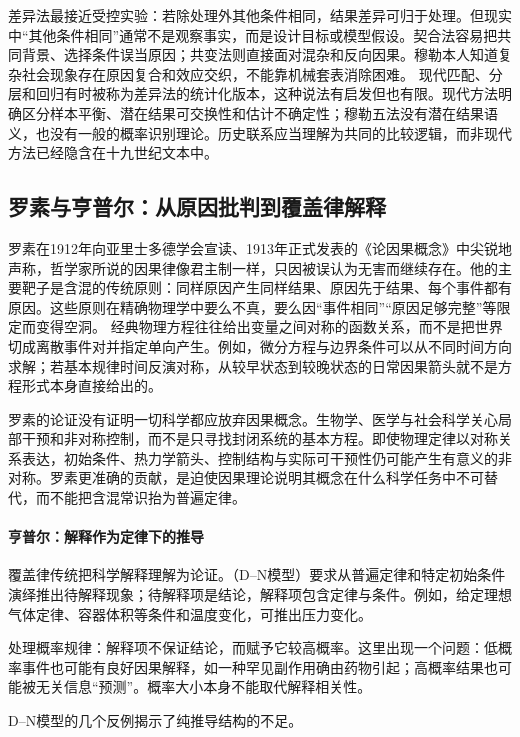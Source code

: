差异法最接近受控实验：若除处理外其他条件相同，结果差异可归于处理。但现实中“其他条件相同”通常不是观察事实，而是设计目标或模型假设。契合法容易把共同背景、选择条件误当原因；共变法则直接面对混杂和反向因果。穆勒本人知道复杂社会现象存在原因复合和效应交织，不能靠机械套表消除困难。
现代匹配、分层和回归有时被称为差异法的统计化版本，这种说法有启发但也有限。现代方法明确区分样本平衡、潜在结果可交换性和估计不确定性；穆勒五法没有潜在结果语义，也没有一般的概率识别理论。历史联系应当理解为共同的比较逻辑，而非现代方法已经隐含在十九世纪文本中。

\subsection{罗素与亨普尔：从原因批判到覆盖律解释}

罗素在1912年向亚里士多德学会宣读、1913年正式发表的《论因果概念》中尖锐地声称，哲学家所说的因果律像君主制一样，只因被误认为无害而继续存在\parencite{russellCausation}。他的主要靶子是含混的传统原则：同样原因产生同样结果、原因先于结果、每个事件都有原因。这些原则在精确物理学中要么不真，要么因“事件相同”“原因足够完整”等限定而变得空洞。
经典物理方程往往给出变量之间对称的函数关系，而不是把世界切成离散事件对并指定单向产生。例如，微分方程与边界条件可以从不同时间方向求解；若基本规律时间反演对称，从较早状态到较晚状态的日常因果箭头就不是方程形式本身直接给出的。

罗素的论证没有证明一切科学都应放弃因果概念。生物学、医学与社会科学关心局部干预和非对称控制，而不是只寻找封闭系统的基本方程。即使物理定律以对称关系表达，初始条件、热力学箭头、控制结构与实际可干预性仍可能产生有意义的非对称。罗素更准确的贡献，是迫使因果理论说明其概念在什么科学任务中不可替代，而不能把含混常识抬为普遍定律。

\paragraph{亨普尔：解释作为定律下的推导}

覆盖律传统把科学解释理解为论证。（D--N模型）要求从普遍定律和特定初始条件演绎推出待解释现象；待解释项是结论，解释项包含定律与条件\parencite{hempel1965}。例如，给定理想气体定律、容器体积等条件和温度变化，可推出压力变化。

处理概率规律：解释项不保证结论，而赋予它较高概率。这里出现一个问题：低概率事件也可能有良好因果解释，如一种罕见副作用确由药物引起；高概率结果也可能被无关信息“预测”。概率大小本身不能取代解释相关性。

D--N模型的几个反例揭示了纯推导结构的不足。

